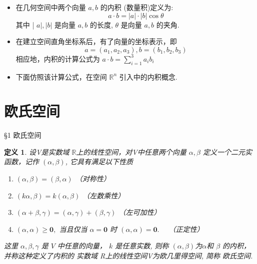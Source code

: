 \documentclass[13pt]{beamer}
\newtheorem*{defi}{定义}
\begin{document}
\begin{frame}
\begin{itemize}
	\item 
在几何空间中两个向量 $a, b$ 的内积 (数量积)定义为:
\[
a \cdot b=|a| \cdot|b| \cos \theta
\]
其中 | ${a}|,| {b} |$ 是向量 $a, b$ 的长度, ${\theta}$ 是向量 ${a}, {b}$ 的夹角. 
 
 \item 
在建立空间直角坐标系后，有了向量的坐标表示，即
\[
a=\left(a_{1}, a_{2}, a_{3}\right), b=\left(b_{1}, b_{2}, b_{3}\right)
\]
相应地，内积的计算公式为 $a \cdot b=\sum_{i=1}^{3} a_{i} b_{i}$

\item 下面仿照该计算公式，在空间 $\mathbb{R}^{n}$ 引入中的内积概念. 
\end{itemize}
\end{frame}

\section{欧氏空间}
\begin{frame}{\S 1 欧氏空间}
\begin{defi}
设V是实数域 $\mathbb{R}$上的线性空间，对V中任意两个向量 $\alpha, \beta$
定义一个二元实函数，记作   $(\alpha, \beta)$, 
它具有满足以下性质
\begin{enumerate}
\item 	$(\alpha, \beta)=(\beta, \alpha)$
	（对称性）
\item 	$(k \alpha, \beta)=k(\alpha, \beta)$
	（左数乘性）
\item 	$(\alpha+\beta, \gamma)=(\alpha, \gamma)+(\beta, \gamma)$  （左可加性）
\item 	$(\alpha, \alpha) \geq \mathbf{0},$ 当且仅当 $\alpha=\mathbf{0}$ 时 $(\alpha, \alpha)=\mathbf{0} . \quad$ （正定性）
\end{enumerate}
这里 $\alpha, \beta, \gamma$ 是 $V$ 中任意的向量， $k$ 是任意实数,
则称 $(\alpha, \beta)$为$\alpha$和  $\beta$  的\alert{内积}，并称这种定义了内积的
实数域 R上的线性空间V为\alert{欧几里得空间}, 简称 \alert{欧氏空间}.

\end{defi}
\end{frame}
\end{document}
